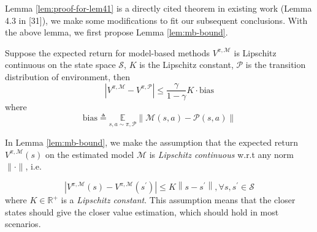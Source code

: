 Lemma \ref{lem:proof-for-lem41} is a directly cited theorem in existing work (Lemma 4.3 in [31]), we make some modifications to fit our subsequent conclusions. With the above lemma, we first propose Lemma \ref{lem:mb-bound}.

\begin{lemma}\label{lem:mb-bound}
Suppose the expected return for model-based methods ${V}^{\pi,\mathcal{M}}$ is Lipschitz continuous on the state space $\mathcal{S}$, $K$ is the Lipschitz constant, $\mathcal{P}$ is the transition distribution of environment, then
\begin{equation}
\left|{V}^{\pi, \mathcal{M}}-{V}^{\pi, \mathcal{P}}\right| \leq\frac{\gamma}{1-\gamma}K\cdot\mathrm{bias}
\end{equation}
where
\begin{equation}
\mathrm{bias} \triangleq \underset{s,a\sim \pi,\mathcal{P}}{\mathbb{E}}\left\|\mathcal{M}(s, a)-\mathcal{P}(s, a)\right\|
\end{equation}

\label{theo:mb-bound}
\end{lemma}

In Lemma \ref{lem:mb-bound}, we make the assumption that the expected return ${V}^{\pi,\mathcal{M}}(s)$ on the estimated model $\mathcal{M}$ is \textit{Lipschitz continuous} w.r.t any norm $\|\cdot\|$, i.e.

\begin{equation}\label{assum:lip}
    \left|{V}^{\pi,\mathcal{M}}(s)-{V}^{\pi,\mathcal{M}}(s^{\prime})\right| \leq K\left\|s-s^{\prime}\right\|, \forall s, s^{\prime} \in \mathcal{S}
\end{equation}
where $K\in \mathbb{R}^+$ is a \textit{Lipschitz constant}. This assumption means that the closer states should give the closer value estimation, which should hold in most scenarios.

